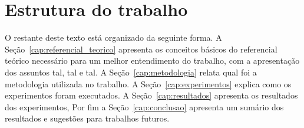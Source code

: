 \section{Estrutura do trabalho}

O restante deste texto está organizado da seguinte forma. A Seção~\ref{cap:referencial_teorico} apresenta os conceitos básicos do referencial teórico necessário para um melhor entendimento do trabalho, com a apresentação dos assuntos tal, tal e tal. A Seção~\ref{cap:metodologia} relata qual foi a metodologia utilizada no trabalho. A Seção~\ref{cap:experimentos} explica como os experimentos foram executados. A Seção~\ref{cap:resultados} apresenta os resultados dos experimentos, Por fim a Seção~\ref{cap:conclusao} apresenta um sumário dos resultados e sugestões para trabalhos futuros.